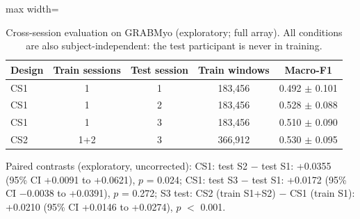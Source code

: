 \begin{table}[htbp]
\centering
\small
\caption{Cross-session evaluation on GRABMyo (exploratory; full array). All conditions are also subject-independent: the test participant is never in training.}
\label{tab:cross_session}
\setlength{\tabcolsep}{4pt}
\begin{adjustbox}{max width=\textwidth}
\begin{tabular}{lcccc}
\toprule
Design & Train sessions & Test session & Train windows & Macro-F1 \\
\midrule
CS1 & 1 & 1 & 183{,}456 & 0.492 $\pm$ 0.101 \\
CS1 & 1 & 2 & 183{,}456 & 0.528 $\pm$ 0.088 \\
CS1 & 1 & 3 & 183{,}456 & 0.510 $\pm$ 0.090 \\
CS2 & 1+2 & 3 & 366{,}912 & 0.530 $\pm$ 0.095 \\
\bottomrule
\end{tabular}
\end{adjustbox}
\par\smallskip\parbox{0.95\linewidth}{\footnotesize Paired contrasts (exploratory, uncorrected): CS1: test S2 $-$ test S1: +0.0355 (95\% CI +0.0091 to +0.0621), $p$ = 0.024; CS1: test S3 $-$ test S1: +0.0172 (95\% CI $-$0.0038 to +0.0391), $p$ = 0.272; S3 test: CS2 (train S1+S2) $-$ CS1 (train S1): +0.0210 (95\% CI +0.0146 to +0.0274), $p$ $<$ 0.001.}
\end{table}
